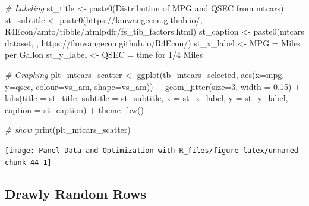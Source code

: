 \documentclass[
]{book}
\newenvironment{Shaded}{\begin{snugshade}}{\end{snugshade}}
\newcommand{\AttributeTok}[1]{\textcolor[rgb]{0.77,0.63,0.00}{#1}}
\newcommand{\CommentTok}[1]{\textcolor[rgb]{0.56,0.35,0.01}{\textit{#1}}}
\newcommand{\DecValTok}[1]{\textcolor[rgb]{0.00,0.00,0.81}{#1}}
\newcommand{\FloatTok}[1]{\textcolor[rgb]{0.00,0.00,0.81}{#1}}
\newcommand{\FunctionTok}[1]{\textcolor[rgb]{0.00,0.00,0.00}{#1}}
\newcommand{\NormalTok}[1]{#1}
\newcommand{\OtherTok}[1]{\textcolor[rgb]{0.56,0.35,0.01}{#1}}
\newcommand{\SpecialCharTok}[1]{\textcolor[rgb]{0.00,0.00,0.00}{#1}}
\newcommand{\StringTok}[1]{\textcolor[rgb]{0.31,0.60,0.02}{#1}}
\begin{document}
\begin{Shaded}
\begin{Highlighting}[]
\CommentTok{\# Labeling}
\NormalTok{st\_title }\OtherTok{\textless{}{-}} \FunctionTok{paste0}\NormalTok{(}\StringTok{\textquotesingle{}Distribution of MPG and QSEC from mtcars\textquotesingle{}}\NormalTok{)}
\NormalTok{st\_subtitle }\OtherTok{\textless{}{-}} \FunctionTok{paste0}\NormalTok{(}\StringTok{\textquotesingle{}https://fanwangecon.github.io/\textquotesingle{}}\NormalTok{,}
                      \StringTok{\textquotesingle{}R4Econ/amto/tibble/htmlpdfr/fs\_tib\_factors.html\textquotesingle{}}\NormalTok{)}
\NormalTok{st\_caption }\OtherTok{\textless{}{-}} \FunctionTok{paste0}\NormalTok{(}\StringTok{\textquotesingle{}mtcars dataset, \textquotesingle{}}\NormalTok{,}
                     \StringTok{\textquotesingle{}https://fanwangecon.github.io/R4Econ/\textquotesingle{}}\NormalTok{)}
\NormalTok{st\_x\_label }\OtherTok{\textless{}{-}} \StringTok{\textquotesingle{}MPG = Miles per Gallon\textquotesingle{}}
\NormalTok{st\_y\_label }\OtherTok{\textless{}{-}} \StringTok{\textquotesingle{}QSEC = time for 1/4 Miles\textquotesingle{}}

\CommentTok{\# Graphing}
\NormalTok{plt\_mtcars\_scatter }\OtherTok{\textless{}{-}} 
  \FunctionTok{ggplot}\NormalTok{(tb\_mtcars\_selected, }
         \FunctionTok{aes}\NormalTok{(}\AttributeTok{x=}\NormalTok{mpg, }\AttributeTok{y=}\NormalTok{qsec, }\AttributeTok{colour=}\NormalTok{vs\_am, }\AttributeTok{shape=}\NormalTok{vs\_am)) }\SpecialCharTok{+}
  \FunctionTok{geom\_jitter}\NormalTok{(}\AttributeTok{size=}\DecValTok{3}\NormalTok{, }\AttributeTok{width =} \FloatTok{0.15}\NormalTok{) }\SpecialCharTok{+}
  \FunctionTok{labs}\NormalTok{(}\AttributeTok{title =}\NormalTok{ st\_title, }\AttributeTok{subtitle =}\NormalTok{ st\_subtitle,}
       \AttributeTok{x =}\NormalTok{ st\_x\_label, }\AttributeTok{y =}\NormalTok{ st\_y\_label, }\AttributeTok{caption =}\NormalTok{ st\_caption) }\SpecialCharTok{+}
  \FunctionTok{theme\_bw}\NormalTok{()}

\CommentTok{\# show}
\FunctionTok{print}\NormalTok{(plt\_mtcars\_scatter)}
\end{Highlighting}
\end{Shaded}

\begin{center}\texttt{[image: Panel-Data-and-Optimization-with-R\_files/figure-latex/unnamed-chunk-44-1]} \end{center}

\hypertarget{drawly-random-rows}{%
\subsection{Drawly Random Rows}\label{drawly-random-rows}}
\end{document}
